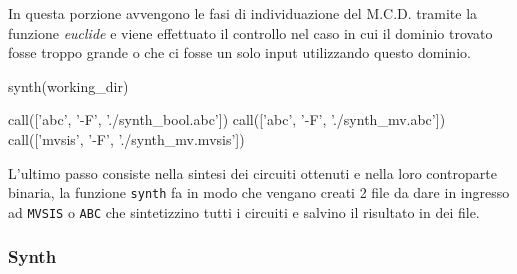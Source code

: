 \documentclass[]{book}
\newenvironment{Shaded}{\begin{snugshade}}{\end{snugshade}}
\newcommand{\BuiltInTok}[1]{#1}
\newcommand{\ControlFlowTok}[1]{\textcolor[rgb]{0.13,0.29,0.53}{\textbf{#1}}}
\newcommand{\DecValTok}[1]{\textcolor[rgb]{0.00,0.00,0.81}{#1}}
\newcommand{\KeywordTok}[1]{\textcolor[rgb]{0.13,0.29,0.53}{\textbf{#1}}}
\newcommand{\NormalTok}[1]{#1}
\newcommand{\OperatorTok}[1]{\textcolor[rgb]{0.81,0.36,0.00}{\textbf{#1}}}
\newcommand{\StringTok}[1]{\textcolor[rgb]{0.31,0.60,0.02}{#1}}
\begin{document}
\newpage

\begin{Shaded}
\end{Shaded}

In questa porzione avvengono le fasi di individuazione del M.C.D. tramite la funzione \emph{euclide} e viene effettuato il controllo nel caso in cui il dominio trovato fosse troppo grande o che ci fosse un solo input utilizzando questo dominio.

\begin{Shaded}
\begin{Highlighting}[]
\NormalTok{synth(working_dir)}

\NormalTok{call([}\StringTok{'abc'}\NormalTok{, }\StringTok{'-F'}\NormalTok{, }\StringTok{'./synth_bool.abc'}\NormalTok{])}
\NormalTok{call([}\StringTok{'abc'}\NormalTok{, }\StringTok{'-F'}\NormalTok{, }\StringTok{'./synth_mv.abc'}\NormalTok{])}
\NormalTok{call([}\StringTok{'mvsis'}\NormalTok{, }\StringTok{'-F'}\NormalTok{, }\StringTok{'./synth_mv.mvsis'}\NormalTok{])}
\end{Highlighting}
\end{Shaded}

L'ultimo passo consiste nella sintesi dei circuiti ottenuti e nella loro controparte binaria, la funzione \texttt{synth} fa in modo che vengano creati 2 file da dare in ingresso ad \texttt{MVSIS} o \texttt{ABC} che sintetizzino tutti i circuiti e salvino il risultato in dei file.

\hypertarget{synth}{%
\subsubsection{Synth}\label{synth}}
\end{document}
